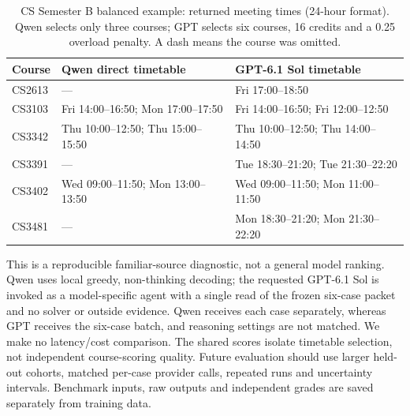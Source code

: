 \documentclass{article}
\begin{document}
\begin{table}[H]
\centering\small
\caption{CS Semester B balanced example: returned meeting times (24-hour format). Qwen selects only three courses; GPT selects six courses, 16 credits and a 0.25 overload penalty. A dash means the course was omitted.}
\begin{tabular}{p{.6in}p{2.2in}p{2.2in}}
\toprule
Course & Qwen direct timetable & GPT-6.1 Sol timetable\\
\midrule
{\raggedright CS2613\par} & {\raggedright ---\par} & {\raggedright Fri 17:00--18:50\par}\\
{\raggedright CS3103\par} & {\raggedright Fri 14:00--16:50; Mon 17:00--17:50\par} & {\raggedright Fri 14:00--16:50; Fri 12:00--12:50\par}\\
{\raggedright CS3342\par} & {\raggedright Thu 10:00--12:50; Thu 15:00--15:50\par} & {\raggedright Thu 10:00--12:50; Thu 14:00--14:50\par}\\
{\raggedright CS3391\par} & {\raggedright ---\par} & {\raggedright Tue 18:30--21:20; Tue 21:30--22:20\par}\\
{\raggedright CS3402\par} & {\raggedright Wed 09:00--11:50; Mon 13:00--13:50\par} & {\raggedright Wed 09:00--11:50; Mon 11:00--11:50\par}\\
{\raggedright CS3481\par} & {\raggedright ---\par} & {\raggedright Mon 18:30--21:20; Mon 21:30--22:20\par}\\
\bottomrule
\end{tabular}
\label{tab:timetable03}
\end{table}

This is a reproducible familiar-source diagnostic, not a general model ranking. Qwen uses local greedy, non-thinking decoding; the requested GPT-6.1 Sol is invoked as a model-specific agent with a single read of the frozen six-case packet and no solver or outside evidence. Qwen receives each case separately, whereas GPT receives the six-case batch, and reasoning settings are not matched. We make no latency/cost comparison. The shared scores isolate timetable selection, not independent course-scoring quality. Future evaluation should use larger held-out cohorts, matched per-case provider calls, repeated runs and uncertainty intervals. Benchmark inputs, raw outputs and independent grades are saved separately from training data.
\end{document}
